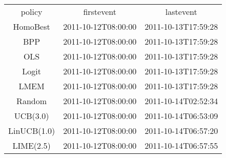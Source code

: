 \begin{tabular}{ccc}
policy & firstevent & lastevent\\
HomoBest & 2011-10-12T08:00:00 & 2011-10-13T17:59:28\\
BPP & 2011-10-12T08:00:00 & 2011-10-13T17:59:28\\
OLS & 2011-10-12T08:00:00 & 2011-10-13T17:59:28\\
Logit & 2011-10-12T08:00:00 & 2011-10-13T17:59:28\\
LMEM & 2011-10-12T08:00:00 & 2011-10-13T17:59:28\\
Random & 2011-10-12T08:00:00 & 2011-10-14T02:52:34\\
UCB(3.0) & 2011-10-12T08:00:00 & 2011-10-14T06:53:09\\
LinUCB(1.0) & 2011-10-12T08:00:00 & 2011-10-14T06:57:20\\
LIME(2.5) & 2011-10-12T08:00:00 & 2011-10-14T06:57:55\\
\end{tabular}

